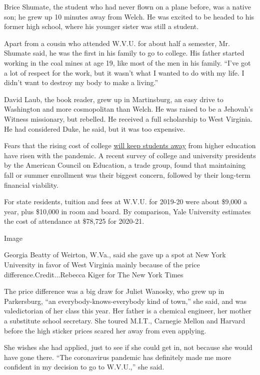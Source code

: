 Brice Shumate, the student who had never flown on a plane before, was a
native son; he grew up 10 minutes away from Welch. He was excited to be
headed to his former high school, where his younger sister was still a
student.

Apart from a cousin who attended W.V.U. for about half a semester, Mr.
Shumate said, he was the first in his family to go to college. His
father started working in the coal mines at age 19, like most of the men
in his family. ``I've got a lot of respect for the work, but it wasn't
what I wanted to do with my life. I didn't want to destroy my body to
make a living.''

David Laub, the book reader, grew up in Martinsburg, an easy drive to
Washington and more cosmopolitan than Welch. He was raised to be a
Jehovah's Witness missionary, but rebelled. He received a full
scholarship to West Virginia. He had considered Duke, he said, but it
was too expensive.

Fears that the rising cost of college
\href{https://www.nytimes.com/2020/04/15/us/coronavirus-colleges-universities-admissions.html}{will
keep students away} from higher education have risen with the pandemic.
A recent survey of college and university presidents by the American
Council on Education, a trade group, found that maintaining fall or
summer enrollment was their biggest concern, followed by their long-term
financial viability.

For state residents, tuition and fees at W.V.U. for 2019-20 were about
\$9,000 a year, plus \$10,000 in room and board. By comparison, Yale
University estimates the cost of attendance at \$78,725 for 2020-21.

Image

Georgia Beatty of Weirton, W.Va., said she gave up a spot at New York
University in favor of West Virginia mainly because of the price
difference.Credit...Rebecca Kiger for The New York Times

The price difference was a big draw for Juliet Wanosky, who grew up in
Parkersburg, ``an everybody-knows-everybody kind of town,'' she said,
and was valedictorian of her class this year. Her father is a chemical
engineer, her mother a substitute school secretary. She toured M.I.T.,
Carnegie Mellon and Harvard before the high sticker prices scared her
away from even applying.

She wishes she had applied, just to see if she could get in, not because
she would have gone there. ``The coronavirus pandemic has definitely
made me more confident in my decision to go to W.V.U.,'' she said.

